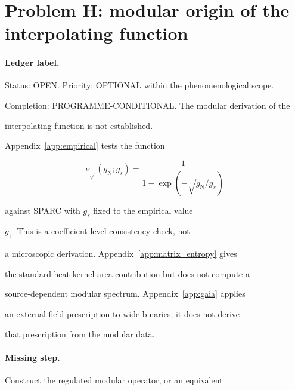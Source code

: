 \section{Problem H: modular origin of the interpolating function}

\label{sec:detailed-Problem H: modular origin of the interpolating function}



\paragraph{Ledger label.} \label{detail:sec-H-paragraphledgerlabel-39}

Status: OPEN. Priority: OPTIONAL within the phenomenological scope.

Completion: PROGRAMME-CONDITIONAL. The modular derivation of the

interpolating function is not established.



Appendix~\ref{app:empirical} tests the function

\[

\nu_{\sqrt{}}(g_{\mathrm N};g_s)

=

\frac{1}{1-\exp\!\left(-\sqrt{g_{\mathrm N}/g_s}\right)}

\]

against SPARC with \(g_s\) fixed to the empirical value

\(g_\dagger\). This is a coefficient-level consistency check, not

a microscopic derivation. Appendix~\ref{app:matrix_entropy} gives

the standard heat-kernel area contribution but does not compute a

source-dependent modular spectrum. Appendix~\ref{app:gaia} applies

an external-field prescription to wide binaries; it does not derive

that prescription from the modular data.





\paragraph{Missing step.} \label{detail:sec-H-paragraphmissingstep-40}

Construct the regulated modular operator, or an equivalent

